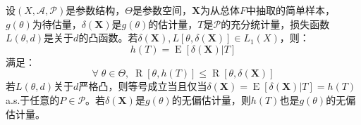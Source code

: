 \begin{theorem}
	\label{theo:Rao-Blackwell}
	设$(X,\mathscr{A},\mathscr{P})$是参数结构，$\Theta$是参数空间，$\mathbf{X}$为从总体$F$中抽取的简单样本，$g(\theta)$为待估量，$\delta(\mathbf{X})$是$g(\theta)$的估计量，$T$是$\mathscr{P}$的充分统计量，损失函数$L(\theta,d)$是关于$d$的凸函数。若$\delta(\mathbf{X}),L[\theta,\delta(\mathbf{X})]\in L_1(X)$，则：
	\begin{equation*}
		h(T)=\operatorname{E}[\delta(\mathbf{X})|T]
	\end{equation*}
	满足：
	\begin{equation*}
		\forall\;\theta\in\Theta,\;\operatorname{R}[\theta,h(T)]\leqslant\operatorname{R}[\theta,\delta(\mathbf{X})]
	\end{equation*}
	若$L(\theta,d)$关于$d$严格凸，则等号成立当且仅当$\delta(\mathbf{X})=\operatorname{E}[\delta(\mathbf{X})|T]=h(T)\;$a.s.于任意的$P\in\mathscr{P}$。若$\delta(\mathbf{X})$是$g(\theta)$的无偏估计量，则$h(T)$也是$g(\theta)$的无偏估计量。
\end{theorem}
